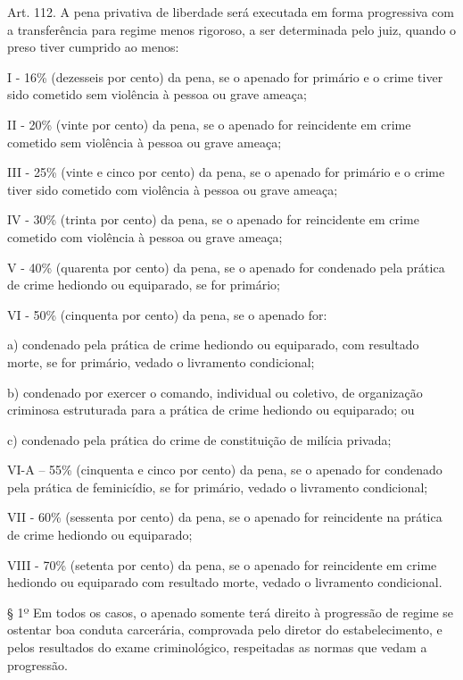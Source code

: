 \begin{citacao}
Art. 112. A pena privativa de liberdade será executada em forma progressiva com a transferência para regime menos rigoroso, a ser determinada pelo juiz, quando o preso tiver cumprido ao menos:

I - 16\% (dezesseis por cento) da pena, se o apenado for primário e o crime tiver sido cometido sem violência à pessoa ou grave ameaça;

II - 20\% (vinte por cento) da pena, se o apenado for reincidente em crime cometido sem violência à pessoa ou grave ameaça;

III - 25\% (vinte e cinco por cento) da pena, se o apenado for primário e o crime tiver sido cometido com violência à pessoa ou grave ameaça;

IV - 30\% (trinta por cento) da pena, se o apenado for reincidente em crime cometido com violência à pessoa ou grave ameaça;

V - 40\% (quarenta por cento) da pena, se o apenado for condenado pela prática de crime hediondo ou equiparado, se for primário;

VI - 50\% (cinquenta por cento) da pena, se o apenado for:

a) condenado pela prática de crime hediondo ou equiparado, com resultado morte, se for primário, vedado o livramento condicional;

b) condenado por exercer o comando, individual ou coletivo, de organização criminosa estruturada para a prática de crime hediondo ou equiparado; ou

c) condenado pela prática do crime de constituição de milícia privada;

VI-A – 55\% (cinquenta e cinco por cento) da pena, se o apenado for condenado pela prática de feminicídio, se for primário, vedado o livramento condicional;

VII - 60\% (sessenta por cento) da pena, se o apenado for reincidente na prática de crime hediondo ou equiparado;

VIII - 70\% (setenta por cento) da pena, se o apenado for reincidente em crime hediondo ou equiparado com resultado morte, vedado o livramento condicional.

§ 1º Em todos os casos, o apenado somente terá direito à progressão de regime se ostentar boa conduta carcerária, comprovada pelo diretor do estabelecimento, e pelos resultados do exame criminológico, respeitadas as normas que vedam a progressão.

\end{citacao}

